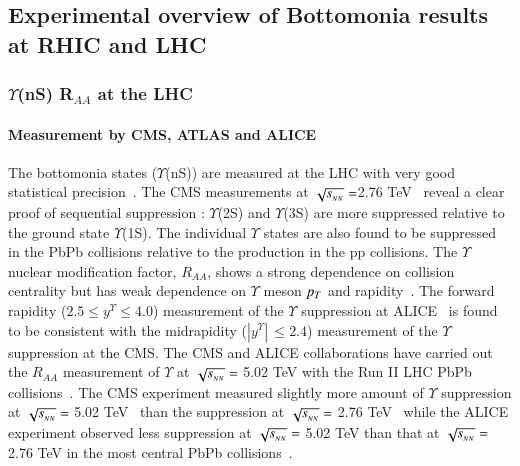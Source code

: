 \subsection{Experimental overview of Bottomonia results at RHIC and LHC}


\subsubsection{$\Upsilon$(nS) R$_{AA}$ at the LHC}

\paragraph{Measurement by CMS, ATLAS and ALICE}

The bottomonia states ($\Upsilon$(nS)) are measured at the LHC with very good statistical
precision~\cite{Chatrchyan:2012lxa,Abelev:2014nua,Chatrchyan:2011pe,Khachatryan:2016xxp}.
The CMS measurements at $\sqrt{s_{_{NN}}} =$2.76 TeV~\cite{Chatrchyan:2012lxa,Chatrchyan:2011pe} reveal
a clear proof of sequential suppression :  $\Upsilon$(2S) and $\Upsilon$(3S) are 
more suppressed relative to the ground state $\Upsilon$(1S).   The individual $\Upsilon$ states are also found to be suppressed in
the PbPb collisions relative to the production in the pp collisions. The $\Upsilon$ nuclear
modification factor, $R_{AA}$, shows a strong dependence on collision centrality but has
weak dependence on $\Upsilon$ meson $p_{T}$ and rapidity~\cite{Khachatryan:2016xxp}.
The forward rapidity ($2.5 \leq y^{\Upsilon} \leq 4.0$) measurement of the $\Upsilon$ suppression at 
ALICE~\cite{Abelev:2014nua} is found to be consistent with the midrapidity ($|y^{\Upsilon}|\,\leq 2.4$)
measurement of the $\Upsilon$ suppression at the CMS. 
The CMS and ALICE collaborations have carried out the $R_{AA}$ measurement of $\Upsilon$
at $\sqrt{s_{_{NN}}} =$ 5.02 TeV with the Run II LHC PbPb
collisions~\cite{Sirunyan:2018nsz,Sirunyan:2017lzi,ALICE:Y5TeV}.
The CMS experiment measured slightly more amount of $\Upsilon$ suppression at
$\sqrt{s_{_{NN}}} =$ 5.02 TeV~\cite{Sirunyan:2018nsz,Sirunyan:2017lzi} than the suppression at
$\sqrt{s_{_{NN}}} =$ 2.76 TeV~\cite{Khachatryan:2016xxp} while the ALICE experiment observed less
suppression at $\sqrt{s_{_{NN}}} =$ 5.02 TeV than that at $\sqrt{s_{_{NN}}} =$ 2.76 TeV 
in the most central PbPb collisions~\cite{Abelev:2014nua,ALICE:Y5TeV}.

